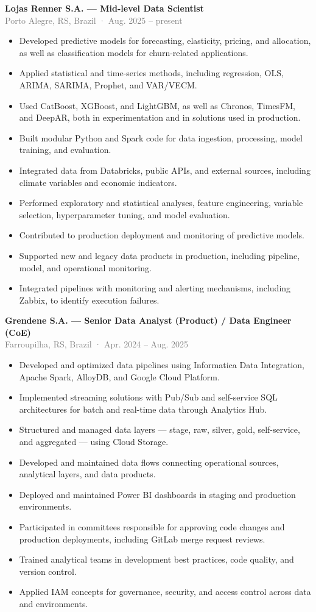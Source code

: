 \documentclass[10pt,a4paper]{article}
\newcommand{\role}[3]{%
  \Needspace{13\baselineskip}%
  \textbf{#1}\\[-1pt]
  {\small\textcolor{grey}{#2}}\\[-1pt]
  #3\par}
\begin{document}
\role{Lojas Renner S.A. — Mid-level Data Scientist}{Porto Alegre, RS, Brazil · Aug. 2025 – present}{
\begin{itemize}
  \item Developed predictive models for forecasting, elasticity, pricing, and allocation, as well as classification models for churn-related applications.
  \item Applied statistical and time-series methods, including regression, OLS, ARIMA, SARIMA, Prophet, and VAR/VECM.
  \item Used CatBoost, XGBoost, and LightGBM, as well as Chronos, TimesFM, and DeepAR, both in experimentation and in solutions used in production.
  \item Built modular Python and Spark code for data ingestion, processing, model training, and evaluation.
  \item Integrated data from Databricks, public APIs, and external sources, including climate variables and economic indicators.
  \item Performed exploratory and statistical analyses, feature engineering, variable selection, hyperparameter tuning, and model evaluation.
  \item Contributed to production deployment and monitoring of predictive models.
  \item Supported new and legacy data products in production, including pipeline, model, and operational monitoring.
  \item Integrated pipelines with monitoring and alerting mechanisms, including Zabbix, to identify execution failures.
\end{itemize}}

\role{Grendene S.A. — Senior Data Analyst (Product) / Data Engineer (CoE)}{Farroupilha, RS, Brazil · Apr. 2024 – Aug. 2025}{
\begin{itemize}
  \item Developed and optimized data pipelines using Informatica Data Integration, Apache Spark, AlloyDB, and Google Cloud Platform.
  \item Implemented streaming solutions with Pub/Sub and self-service SQL architectures for batch and real-time data through Analytics Hub.
  \item Structured and managed data layers — stage, raw, silver, gold, self-service, and aggregated — using Cloud Storage.
  \item Developed and maintained data flows connecting operational sources, analytical layers, and data products.
  \item Deployed and maintained Power BI dashboards in staging and production environments.
  \item Participated in committees responsible for approving code changes and production deployments, including GitLab merge request reviews.
  \item Trained analytical teams in development best practices, code quality, and version control.
  \item Applied IAM concepts for governance, security, and access control across data and environments.
\end{itemize}}
\end{document}
